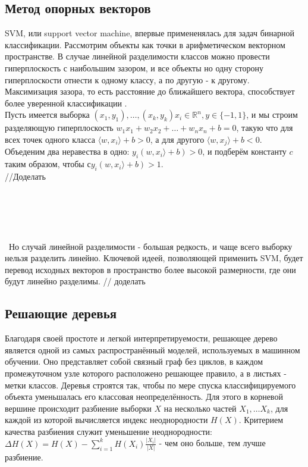 \documentclass{article}
\begin{document}
    \subsection*{Метод опорных векторов \citep{Smola2004}} 
        SVM, или support vector machine, впервые примененялась для задач бинарной классификации. Рассмотрим объекты как точки в арифметическом векторном пространстве. В случае линейной разделимости классов можно провести гиперплоскость с наибольшим зазором, и все объекты но одну сторону гиперплоскости отнести к одному классу, а по другую - к другому. Максимизация зазора, то есть расстояние до ближайшего вектора, способствует более уверенной классификации \citep{vapnik2000bounds}. \\
        Пусть имеется выборка $(x_1, y_1), \dots, (x_k, y_k) x_i \in \mathbb{R}^n, y \in \{-1, 1\}$, и мы строим разделяющую гиперплоскость $w_1 x_1 + w_2 x_2 + \dots + w_n x_n + b = 0$, такую что для всех точек одного класса $\langle w, x_i \rangle + b > 0$, а для другого $\langle w, x_j \rangle + b < 0$. Объеденим два неравества в одно: $y_i(w, x_i \rangle + b) > 0$, и подберём константу $c$ таким образом, чтобы $с y_i(w, x_i \rangle + b) > 1$. \\
        //Доделать
        \\\\\\\\\\\\\
        Но случай линейной разделимости - большая редкость, и чаще всего выборку нельзя разделить линейно. Ключевой идеей, позволяющей применить SVM, будет перевод исходных векторов в пространство более высокой размерности, где они будут линейно разделимы.
        // доделать  
    \subsection*{Решающие деревья\citep{safavian1991survey}}
         Благодаря своей простоте и легкой интерпретируемости, решающее дерево является одной из самых распространённый моделей, используемых в машинном обучении. Оно представляет собой связный граф без циклов, в каждом промежуточном узле которого расположено решающее правило, а в листьях - метки классов. Деревья строятся так, чтобы по мере спуска классифицируемого объекта уменьшалась его классовая неопределённость.
         Для этого в корневой вершине происходит разбиение выборки $X$ на несколько частей $X_1, \dots X_k$, для каждой из которой вычисляется индекс неоднородности $H(X)$. Критерием качества разбиения служит уменьшение неоднородности: $\Delta H(X) = H(X) - \sum\limits_{i = 1}^k H(X_i) \frac{|X_i|}{|X|}$ - чем оно больше, тем лучше разбиение. 
         
\end{document}
